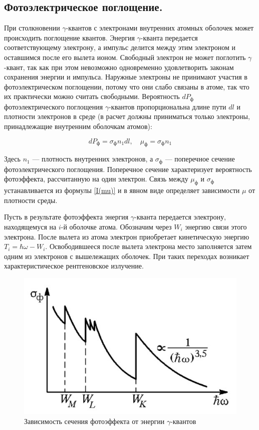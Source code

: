 \documentclass[a4paper, 12pt]{article}%
\begin{document}
	\subsection*{Фотоэлектрическое поглощение.} При столкновении $\gamma$-квантов с электронами внутренних атомных оболочек может происходить поглощение квантов. Энергия $\gamma$-кванта передается соответствующему электрону, а импульс делится между этим электроном и оставшимся после его вылета ионом. Свободный электрон не может поглотить $\gamma$-квант, так как при этом невозможно одновременно удовлетворить законам сохранения энергии и импульса. Наружные электроны не принимают участия в фотоэлектрическом поглощении, потому что они слабо связаны в атоме, так что их практически можно считать свободными. Вероятность $ dP_{\text{ф}} $ фотоэлектрического поглощения $\gamma$-квантов пропорциональна длине пути $ dl $ и плотности электронов в среде (в расчет должны приниматься только электроны, принадлежащие внутренним оболочкам атомов):
	
	\begin{equation}\label{mu ph}
	dP_{\text{ф}} = \sigma_{\text{ф}} n_1 dl, \quad \mu_{\text{ф}} = \sigma_{\text{ф}} n_1
	\end{equation}
	
	Здесь $ n_1 $ --- плотность внутренних электронов, а $ \sigma_{\text{ф}} $ --- поперечное сечение фотоэлектрического поглощения. Поперечное сечение характеризует вероятность фотоэффекта, рассчитанную на один электрон. Связь между $ \mu_{\text{ф}} $ и $ \sigma_{\text{ф}} $ устанавливается из формулы \eqref{I(mu)} и в явном виде определяет зависимости $ \mu $ от плотности среды.
	
	Пусть в результате фотоэффекта энергия $\gamma$-кванта передается
	электрону, находящемуся на $ i $-й оболочке атома. Обозначим через $ W_i $
	энергию связи этого электрона. После вылета из атома электрон приобретает кинетическую энергию $ T_i = \hbar \omega - W_i $.
	Освободившееся после вылета электрона место заполняется затем
	одним из электронов с вышележащих оболочек. При таких переходах
	возникает характеристическое рентгеновское излучение.
	\begin{figure}
		\includegraphics[width=\linewidth]{2.jpg}
		\caption{Зависимость сечения фотоэффекта от энергии $\gamma$-квантов}
		\label{ris photo}
	\end{figure}
	
\end{document}
